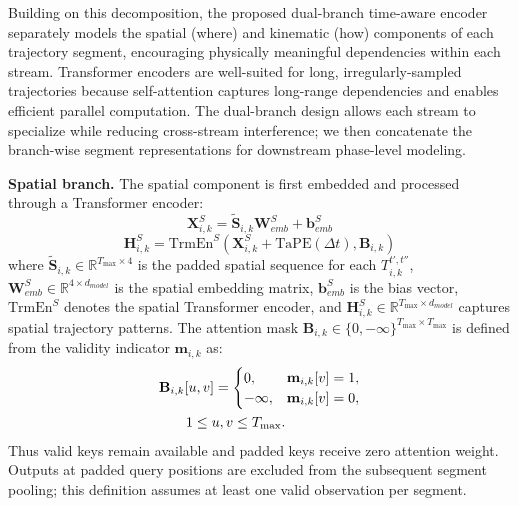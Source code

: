 \documentclass[iicol,pdflatex,sn-basic,Numbered]{sn-jnl}%
\theoremstyle{thmstyleone}%
\theoremstyle{thmstyletwo}%
\theoremstyle{thmstylethree}%
\begin{document}
Building on this decomposition, the proposed dual-branch time-aware encoder separately models the spatial (where) and kinematic (how) components of each trajectory segment, encouraging physically meaningful dependencies within each stream. Transformer encoders are well-suited for long, irregularly-sampled trajectories because self-attention captures long-range dependencies and enables efficient parallel computation. The dual-branch design allows each stream to specialize while reducing cross-stream interference; we then concatenate the branch-wise segment representations for downstream phase-level modeling.

\textbf{Spatial branch.} The spatial component is first embedded and processed through a Transformer encoder:
\begin{equation}
\mathbf{X}_{i,k}^S = \tilde{\mathbf{S}}_{i,k} \mathbf{W}_{emb}^S + \mathbf{b}_{emb}^S
\end{equation}
\begin{equation}
\mathbf{H}_{i,k}^S = \text{TrmEn}^S(\mathbf{X}_{i,k}^S + \mathrm{TaPE}(\Delta t), \mathbf{B}_{i,k})
\end{equation}
where $\tilde{\mathbf{S}}_{i,k} \in \mathbb{R}^{T_{\max} \times 4}$ is the padded spatial sequence for each $T^{t',t''}_{i,k}$, $\mathbf{W}_{emb}^S \in \mathbb{R}^{4 \times d_{model}}$ is the spatial embedding matrix, $\mathbf{b}_{emb}^S$ is the bias vector, $\text{TrmEn}^S$ denotes the spatial Transformer encoder, and $\mathbf{H}_{i,k}^S \in \mathbb{R}^{T_{\max} \times d_{model}}$ captures spatial trajectory patterns. The attention mask $\mathbf{B}_{i,k} \in \{0, -\infty\}^{T_{\max} \times T_{\max}}$ is defined from the validity indicator $\mathbf{m}_{i,k}$ as:
\begin{equation}
\begin{aligned}
\mathbf{B}_{i,k}[u,v] & =
\begin{cases}
0, & \mathbf{m}_{i,k}[v]=1,\\
-\infty, & \mathbf{m}_{i,k}[v]=0,
\end{cases}\\
&\hspace{-2em}1\leq u,v\leq T_{\max}.
\end{aligned}
\end{equation}
Thus valid keys remain available and padded keys receive zero attention weight. Outputs at padded query positions are excluded from the subsequent segment pooling; this definition assumes at least one valid observation per segment.
\end{document}
